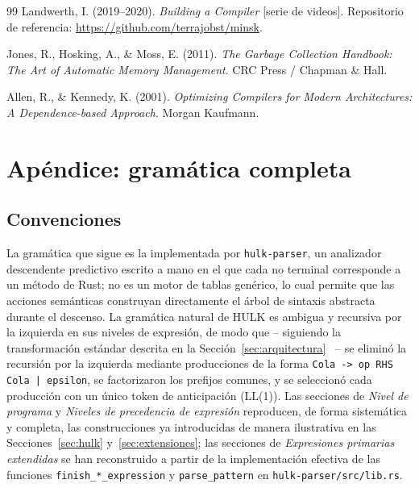 \documentclass[12pt, a4paper]{article}
\begin{document}
\begin{thebibliography}{99}
Landwerth, I. (2019--2020). \textit{Building a Compiler} [serie de videos].
Repositorio de referencia: \url{https://github.com/terrajobst/minsk}.

Jones, R., Hosking, A., \& Moss, E. (2011). \textit{The Garbage Collection
Handbook: The Art of Automatic Memory Management}. CRC Press / Chapman \&
Hall.

Allen, R., \& Kennedy, K. (2001). \textit{Optimizing Compilers for Modern
Architectures: A Dependence-based Approach}. Morgan Kaufmann.

\end{thebibliography}


\section{Apéndice: gramática completa}
\label{sec:apendice-gramatica}

\subsection{Convenciones}

La gramática que sigue es la implementada por \texttt{hulk-parser}, un
analizador descendente predictivo escrito a mano en el que cada no terminal
corresponde a un método de Rust; no es un motor de tablas genérico, lo cual
permite que las acciones semánticas construyan directamente el árbol de
sintaxis abstracta durante el descenso. La gramática natural de HULK es
ambigua y recursiva por la izquierda en sus niveles de expresión, de modo que
-- siguiendo la transformación estándar descrita en la Sección~\ref{sec:arquitectura}~\cite{aho1986}
-- se eliminó la recursión por la izquierda mediante producciones de la
forma \texttt{Cola -> op RHS Cola | epsilon}, se factorizaron los prefijos
comunes, y se seleccionó cada producción con un único token de anticipación
(LL(1)). Las secciones de \textit{Nivel de programa} y \textit{Niveles de
precedencia de expresión} reproducen, de forma sistemática y completa, las
construcciones ya introducidas de manera ilustrativa en las
Secciones~\ref{sec:hulk} y~\ref{sec:extensiones}; las secciones de
\textit{Expresiones primarias extendidas} se han reconstruido a partir de la
implementación efectiva de las funciones \texttt{finish\_*\_expression} y
\texttt{parse\_pattern} en \texttt{hulk-parser/src/lib.rs}.
\end{document}

